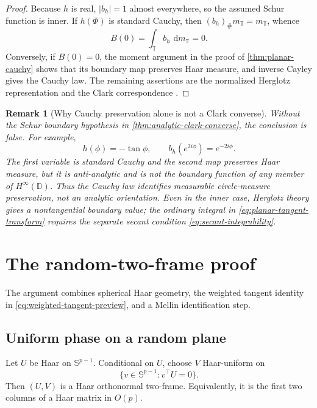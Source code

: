 \documentclass[11pt]{article}
\numberwithin{equation}{section}
\theoremstyle{thmstyleone}%
\theoremstyle{thmstyletwo}%
\newtheorem*{remark}{Remark}%
\let\cref\autoref
\newcommand{\D}{\mathbb D}
\newcommand{\sphere}{\mathbb S}
\newcommand{\dd}{\,\mathrm d}
\begin{document}
\begin{proof}
Because \(h\) is real, \(|b_h|=1\) almost everywhere, so the assumed Schur
function is inner.  If \(h(\Phi)\) is standard Cauchy, then
\((b_h)_\#m_{\mathbb T}=m_{\mathbb T}\), whence
\[
  B(0)=\int_{\mathbb T}b_h\,\dd m_{\mathbb T}=0.
\]
Conversely, if \(B(0)=0\), the moment argument in the proof of
\cref{thm:planar-cauchy} shows that its boundary map preserves Haar
measure, and inverse Cayley gives the Cauchy law.  The remaining assertions
are the normalized Herglotz representation and the Clark correspondence
\cite{clark-1972,cima-matheson-ross-2006}.
\end{proof}

\begin{remark}[Why Cauchy preservation alone is not a Clark converse]
\label{rem:measurable-not-inner}
Without the Schur boundary hypothesis in
\cref{thm:analytic-clark-converse}, the conclusion is false.  For example,
\[
  h(\phi)=-\tan\phi,
  \qquad
  b_h(e^{2i\phi})=e^{-2i\phi}.
\]
The first variable is standard Cauchy and the second map preserves Haar
measure, but it is anti-analytic and is not the boundary function of any
member of \(H^\infty(\D)\).  Thus the Cauchy law identifies measurable
circle-measure preservation, not an analytic orientation.  Even in the
inner case, Herglotz theory gives a nontangential boundary value; the
ordinary integral in \cref{eq:planar-tangent-transform} requires the
separate secant condition \cref{eq:secant-integrability}.
\end{remark}

\section{The random-two-frame proof}
\label{sec:two-frame-proof}

The argument combines spherical Haar geometry, the weighted tangent identity
in \cref{eq:weighted-tangent-preview}, and a Mellin identification step.

\subsection{Uniform phase on a random plane}

Let \(U\) be Haar on \(\sphere^{p-1}\).  Conditional on \(U\), choose \(V\)
Haar-uniform on
\[
  \{v\in\sphere^{p-1}:v^\top U=0\}.
\]
Then \((U,V)\) is a Haar orthonormal two-frame.  Equivalently, it is the first
two columns of a Haar matrix in \(O(p)\).
\end{document}
